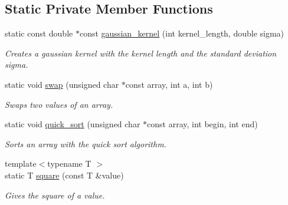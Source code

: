 \subsection*{Static Private Member Functions}
\begin{DoxyCompactItemize}
\item 
\hypertarget{classofeli_1_1_filters_abfd6b12417b42693a903e35f01608969}{static const double $\ast$const \hyperlink{classofeli_1_1_filters_abfd6b12417b42693a903e35f01608969}{gaussian\-\_\-kernel} (int kernel\-\_\-length, double sigma)}\label{classofeli_1_1_filters_abfd6b12417b42693a903e35f01608969}

\begin{DoxyCompactList}\small\item\em Creates a gaussian kernel with the kernel length and the standard deviation sigma. \end{DoxyCompactList}\item 
\hypertarget{classofeli_1_1_filters_afe930659890f200f2f8874ef68be5a10}{static void \hyperlink{classofeli_1_1_filters_afe930659890f200f2f8874ef68be5a10}{swap} (unsigned char $\ast$const array, int a, int b)}\label{classofeli_1_1_filters_afe930659890f200f2f8874ef68be5a10}

\begin{DoxyCompactList}\small\item\em Swaps two values of an array. \end{DoxyCompactList}\item 
\hypertarget{classofeli_1_1_filters_a93dda800c3f3a0053cccde23a457656f}{static void \hyperlink{classofeli_1_1_filters_a93dda800c3f3a0053cccde23a457656f}{quick\-\_\-sort} (unsigned char $\ast$const array, int begin, int end)}\label{classofeli_1_1_filters_a93dda800c3f3a0053cccde23a457656f}

\begin{DoxyCompactList}\small\item\em Sorts an array with the quick sort algorithm. \end{DoxyCompactList}\item 
\hypertarget{classofeli_1_1_filters_a4db66fc6e849d67e5bc89dbc72fe6282}{{\footnotesize template$<$typename T $>$ }\\static T \hyperlink{classofeli_1_1_filters_a4db66fc6e849d67e5bc89dbc72fe6282}{square} (const T \&value)}\label{classofeli_1_1_filters_a4db66fc6e849d67e5bc89dbc72fe6282}

\begin{DoxyCompactList}\small\item\em Gives the square of a value. \end{DoxyCompactList}\end{DoxyCompactItemize}
